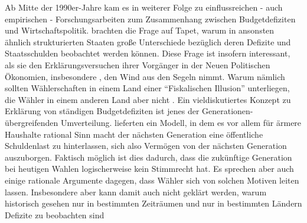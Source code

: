 Ab Mitte der 1990er-Jahre kam es in weiterer Folge zu einflussreichen - auch empirischen - Forschungsarbeiten zum Zusammenhang zwischen Budgetdefiziten und Wirtschaftspolitik. \textcite{Perotti1995b} brachten die Frage auf Tapet, warum in ansonsten ähnlich strukturierten Staaten große Unterschiede bezüglich deren Defizite und Staatsschulden beobachtet werden können. Diese Frage ist insofern interessant, als sie den Erklärungsversuchen ihrer Vorgänger in der Neuen Politischen Ökonomien, insbesondere \textcite{Buchanan1977}, den Wind aus den Segeln nimmt. Warum nämlich sollten Wählerschaften in einem Land einer "`Fiskalischen Illusion"' unterliegen, die Wähler in einem anderen Land aber nicht \parencite[S. 12]{Perotti1995b}. Ein vieldiskutiertes Konzept zu Erklärung von ständigen Budgetdefiziten ist jenes der Generationen-übergreifenden Umverteilung. \textcite{Cukierman1989} lieferten ein Modell, in dem es vor allem für ärmere Haushalte rational Sinn macht der nächsten Generation eine öffentliche Schuldenlast zu hinterlassen, sich also Vermögen von der nächsten Generation auszuborgen. Faktisch möglich ist dies dadurch, dass die zukünftige Generation bei heutigen Wahlen logischerweise kein Stimmrecht hat. Es sprechen aber auch einige rationale Argumente dagegen, dass Wähler sich von solchen Motiven leiten lassen. Insbesondere aber kann damit auch nicht geklärt werden, warum historisch gesehen nur in bestimmten Zeiträumen und nur in bestimmten Ländern Defizite zu beobachten sind \parencite{Perotti1995b}

